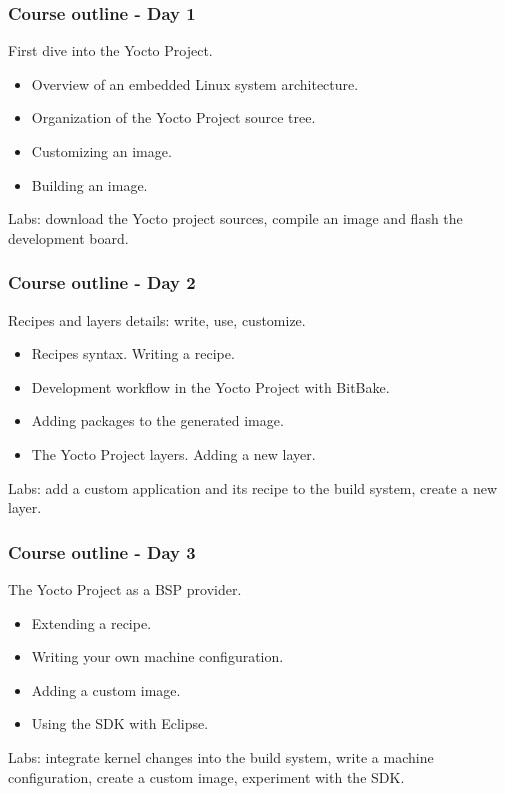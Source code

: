 \begin{frame}
\frametitle{Course outline - Day 1}
First dive into the Yocto Project.
\begin{itemize}
\item Overview of an embedded Linux system architecture.
\item Organization of the Yocto Project source tree.
\item Customizing an image.
\item Building an image.
\end{itemize}
Labs: download the Yocto project sources, compile an image and flash
the development board.
\end{frame}

\begin{frame}
\frametitle{Course outline - Day 2}
Recipes and layers details: write, use, customize.
\begin{itemize}
\item Recipes syntax. Writing a recipe.
\item Development workflow in the Yocto Project with BitBake.
\item Adding packages to the generated image.
\item The Yocto Project layers. Adding a new layer.
\end{itemize}
Labs: add a custom application and its recipe to the build system,
create a new layer.
\end{frame}

\begin{frame}
\frametitle{Course outline - Day 3}
The Yocto Project as a BSP provider.
\begin{itemize}
\item Extending a recipe.
\item Writing your own machine configuration.
\item Adding a custom image.
\item Using the SDK with Eclipse.
\end{itemize}
Labs: integrate kernel changes into the build system, write a machine
configuration, create a custom image, experiment with the SDK.
\end{frame}
